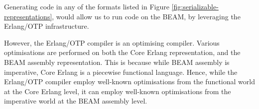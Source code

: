 Generating code in any of the formats listed in Figure
\ref{fig:serializable-representations}, would allow us to run code on
the BEAM, by leveraging the Erlang/OTP infrastructure.

However, the Erlang/OTP compiler is an optimising compiler. Various
optimisations are performed on both the Core Erlang representation,
and the BEAM assembly representation. This is because while BEAM
assembly is imperative, Core Erlang is a piecewise functional
language. Hence, while the Erlang/OTP compiler employ well-known
optimisations from the functional world at the Core Erlang level, it
can employ well-known optimisations from the imperative world at the
BEAM assembly level.


